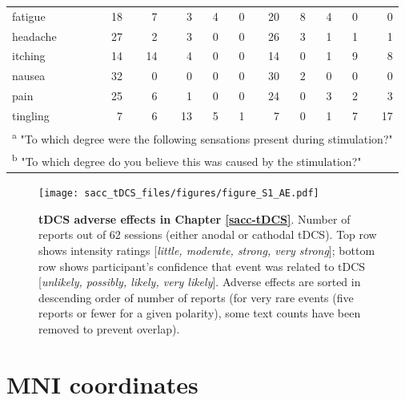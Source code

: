 \documentclass[11pt,english,]{memoir}
\newcommand{\blandscape}{\begin{landscape}}
\newcommand{\elandscape}{\end{landscape}}
\def\defstyle{Ruled} %
\begin{document}
\begin{longtable}{lrrrrrrrrrr}
\hspace{1em}fatigue & 18 & 7 & 3 & 4 & 0 & 20 & 8 & 4 & 0 & 0\\
\hspace{1em}headache & 27 & 2 & 3 & 0 & 0 & 26 & 3 & 1 & 1 & 1\\
\hspace{1em}itching & 14 & 14 & 4 & 0 & 0 & 14 & 0 & 1 & 9 & 8\\
\hspace{1em}nausea & 32 & 0 & 0 & 0 & 0 & 30 & 2 & 0 & 0 & 0\\
\hspace{1em}pain & 25 & 6 & 1 & 0 & 0 & 24 & 0 & 3 & 2 & 3\\
\hspace{1em}tingling & 7 & 6 & 13 & 5 & 1 & 7 & 0 & 1 & 7 & 17\\
\bottomrule
\multicolumn{11}{l}{\textsuperscript{a} "To which degree were the following sensations present during stimulation?"}\\
\multicolumn{11}{l}{\textsuperscript{b} "To which degree do you believe this was caused by the stimulation?"}\\
\end{longtable}
\endgroup{}

\endgroup

\newpage
\pagestyle{empty}
\changetext{}{}{-25mm}{}{}
\blandscape

\begin{figure}
\centering
\texttt{[image: sacc\_tDCS\_files/figures/figure\_S1\_AE.pdf]}
\caption{\label{fig:fig-sacc-tDCS-AE}\textbf{tDCS adverse effects in Chapter \ref{sacc-tDCS}}. Number of reports out of 62 sessions (either anodal or cathodal tDCS). Top row shows intensity ratings {[}\emph{little, moderate, strong, very strong}{]}; bottom row shows participant's confidence that event was related to tDCS {[}\emph{unlikely, possibly, likely, very likely}{]}. Adverse effects are sorted in descending order of number of reports (for very rare events (five reports or fewer for a given polarity), some text counts have been removed to prevent overlap).}
\end{figure}



\newpage
\elandscape
\changetext{}{}{+25mm}{}{}
\pagestyle{\defstyle}

\hypertarget{mni-coordinates}{%
\section{MNI coordinates}\label{mni-coordinates}}
\end{document}
